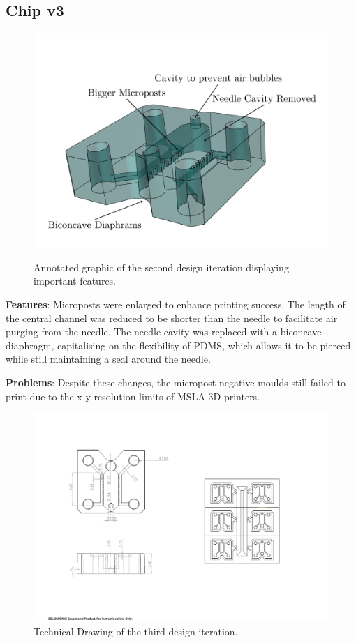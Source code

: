 \documentclass[letterpaper,12pt]{article}
\begin{document}
\clearpage

\subsection{Chip v3}
\begin{figure}[!h]
    \centering
    \includegraphics[width=1\linewidth]{dapp_report/figures/second_iter.png}
    \label{fig:second_iter}
    \caption{Annotated graphic of the second design iteration displaying important features.}
\end{figure}

\textbf{Features}: Microposts were enlarged to enhance printing success. The length of the central channel was reduced to be shorter than the needle to facilitate air purging from the needle. The needle cavity was replaced with a biconcave diaphragm, capitalising on the flexibility of PDMS, which allows it to be pierced while still maintaining a seal around the needle.

\textbf{Problems}: Despite these changes, the micropost negative moulds still failed to print due to the x-y resolution limits of MSLA 3D printers.


\begin{figure}[!h]
    \centering
    \includegraphics[width=1\linewidth]{PDF/TDV3.pdf}
    \caption{Technical Drawing of the third design iteration.}
    \label{fig:enter-label}
\end{figure}
\end{document}
